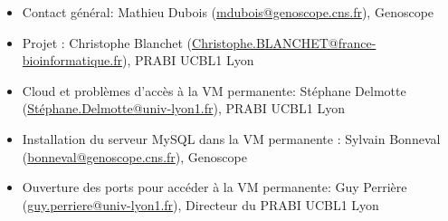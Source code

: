 \begin{itemize}
    \item Contact général: Mathieu Dubois (\href{mailto:mdubois@genoscope.cns.fr}{mdubois@genoscope.cns.fr}), Genoscope
    \item Projet : Christophe Blanchet (\href{mailto:Christophe.BLANCHET@france-bioinformatique.fr}{Christophe.BLANCHET@france-bioinformatique.fr}), PRABI UCBL1 Lyon
    \item Cloud  et problèmes d'accès à la VM permanente: Stéphane Delmotte (\href{mailto:Stéphane.Delmotte@univ-lyon1.fr}{Stéphane.Delmotte@univ-lyon1.fr}), PRABI UCBL1 Lyon
    \item Installation du serveur MySQL dans la VM permanente : Sylvain Bonneval (\href{mailto:bonneval@genoscope.cns.fr}{bonneval@genoscope.cns.fr}), Genoscope
    \item Ouverture des ports pour accéder à la VM permanente: Guy Perrière (\href{mailto:guy.perriere@univ-lyon1.fr}{guy.perriere@univ-lyon1.fr}), Directeur du PRABI UCBL1 Lyon
\end{itemize}
